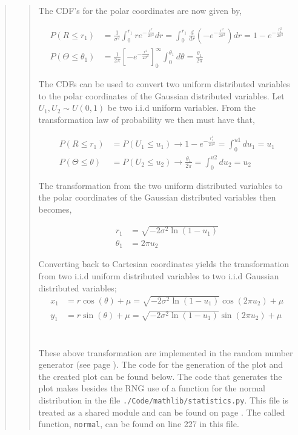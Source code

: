 \begin{quote}
\begin{quote}
The CDF's  for the polar coordinates are now given by, %

\begin{align}
P(R \leq r_1) &= \frac{1}{\sigma^2} \int_{0}^{r_1}  re^{ -\frac{r^2}{2 \sigma ^2} } dr =  \int_{0}^{r_1} \frac{d}{dr} \left( -e^{ -\frac{r^2}{2 \sigma ^2}}  \right) dr = 1 - e^{- \frac{r_1^2}{2 \sigma^2}} \\
P(\Theta \leq \theta_1) &= \frac{1}{2 \pi }  \left[ -e^{-\frac{r^2}{2 \sigma^2}} \right]^{\infty}_{0} \int_{0}^{\theta_1} d\theta = \frac{\theta_1}{2\pi}
\end{align}

The CDFs can be used to convert  two uniform distributed variables to the polar coordinates of the Gaussian distributed variables. Let $U_1, U_2 \sim U(0,1)$ be two i.i.d uniform variables. From the transformation law of probability we then must have that, %

\begin{align}
P(R \leq r_1) &= P(U_1 \leq u_1) \rightarrow  1 - e^{- \frac{r_1^2}{2\sigma^2}}  = \int_{0}^{u1} du_1 = u_1 \\
P(\Theta \leq \theta) &= P(U_2 \leq u_2) \rightarrow   \frac{\theta_1}{2\pi} = \int_{0}^{u2} du_2 = u_2 
\end{align}

The transformation from the two uniform distributed variables to the polar coordinates of the Gaussian distributed variables then becomes,

\begin{align}
r_1 &=  \sqrt{-2\sigma^2 \ln(1 - u_1)} \\
\theta_1 &= 2 \pi u_2
\end{align}

Converting back to Cartesian coordinates  yields the transformation from two i.i.d uniform distributed variables to two i.i.d Gaussian distributed variables;
\begin{align}
x_1 &= r\cos(\theta) + \mu = \sqrt{-2\sigma^2 \ln(1 - u_1)} \cos( 2 \pi u_2 ) + \mu \\
y_1 &= r\sin(\theta) + \mu = \sqrt{-2\sigma^2 \ln(1 - u_1)} \sin( 2 \pi u_2 ) + \mu
\label{EQ:boxmuller}
\end{align}
\\
\\
These above transformation are implemented in  the random number generator (see page \pageref{CODE:RNG}).  The code for the generation of the plot and the created plot can be found below. The code that generates the plot makes besides the RNG use of a function for the normal distribution in the file \texttt{./Code/mathlib/statistics.py}. This file is treated as a shared module and can be found on page \pageref{CODE:Statistics}. The called function, \texttt{normal}, can be found on line 227 in this file.



\end{quote}
\end{quote}
